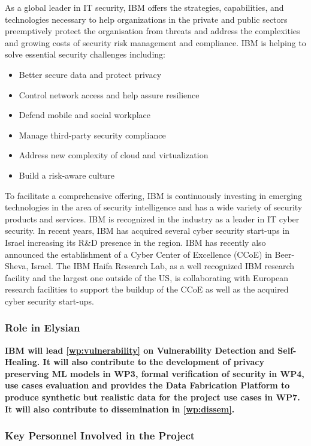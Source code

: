 \documentclass[a4paper,11pt]{article}
\begin{document}
As a global leader in IT security, IBM offers the strategies, capabilities, and technologies necessary to help organizations in the private and public sectors preemptively protect the organisation from threats and address the complexities and growing costs of security risk management and compliance. IBM is helping to solve essential security challenges including:
\begin{itemize}
\item Better secure data and protect privacy
\item Control network access and help assure resilience
\item Defend mobile and social workplace
\item Manage third-party security compliance
\item Address new complexity of cloud and virtualization
\item Build a risk-aware culture
\end{itemize} 	

To facilitate a comprehensive offering, IBM is continuously investing in emerging technologies in the area of security intelligence and has a wide variety of security products and services. IBM is recognized in the industry as a leader in IT cyber security.
In recent years, IBM has acquired several cyber security start-ups in Israel increasing its R\&D presence in the region. IBM has recently also announced the establishment of a Cyber Center of Excellence (CCoE) in Beer-Sheva, Israel. The IBM Haifa Research Lab, as a well recognized IBM research facility and the largest one outside of the US, is collaborating with European research facilities to support the buildup of the CCoE as well as the acquired cyber security start-ups.

\vspace{10pt}
\subsubsection*{Role in Elysian}
\textbf{IBM will lead  \ref{wp:vulnerability}  on Vulnerability Detection and Self-Healing. It will also contribute to the development of privacy preserving ML models in WP3, formal verification of security in WP4, use cases evaluation and provides the Data Fabrication Platform to produce synthetic but realistic data for the project use cases in WP7. It will also contribute to dissemination in
\ref{wp:dissem}.}

\vspace{10pt}
\subsubsection*{Key Personnel Involved in the Project}
\end{document}
